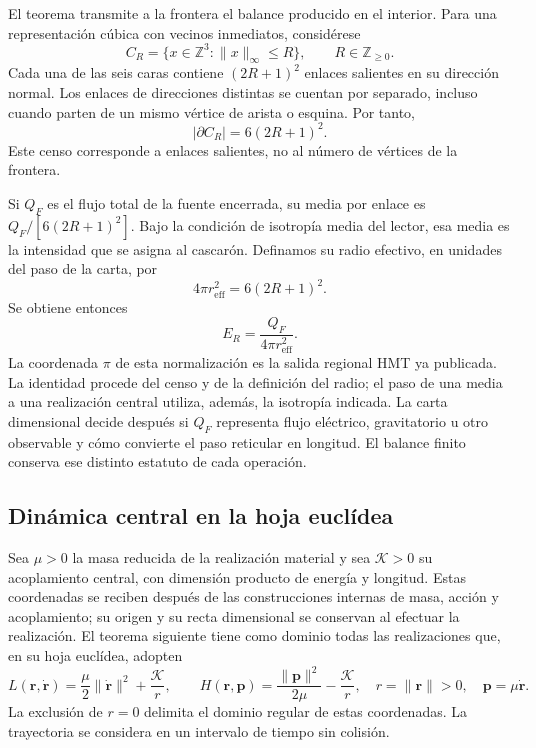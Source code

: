 El teorema transmite a la frontera el balance producido en el
interior. Para una representación cúbica con vecinos inmediatos,
considérese
\[
 C_R=\{x\in\mathbb Z^3:\|x\|_\infty\leq R\},
 \qquad R\in\mathbb Z_{\geq0}.
\]
Cada una de las seis caras contiene $(2R+1)^2$ enlaces
salientes en su dirección normal. Los enlaces de direcciones
distintas se cuentan por separado, incluso cuando parten de
un mismo vértice de arista o esquina. Por tanto,
\begin{equation}
 |\partial C_R|=6(2R+1)^2.
 \label{vi:eq:frontera-cubica}
\end{equation}
Este censo corresponde a enlaces salientes, no al número de
vértices de la frontera.

Si $Q_F$ es el flujo total de la fuente encerrada, su media
por enlace es $Q_F/[6(2R+1)^2]$. Bajo la condición de isotropía
media del lector, esa media es la intensidad que se asigna al
cascarón. Definamos su radio efectivo, en unidades del paso de
la carta, por
\begin{equation}
 4\pi r_{\mathrm{eff}}^2=6(2R+1)^2.
 \label{vi:eq:radio-efectivo}
\end{equation}
Se obtiene entonces
\begin{equation}
 E_R=\frac{Q_F}{4\pi r_{\mathrm{eff}}^2}.
 \label{vi:eq:inverso-area}
\end{equation}
La coordenada $\pi$ de esta normalización es la salida regional
HMT ya publicada. La identidad procede del censo y de la
definición del radio; el paso de una media a una realización
central utiliza, además, la isotropía indicada. La carta
dimensional decide después si $Q_F$ representa flujo eléctrico,
gravitatorio u otro observable y cómo convierte el paso
reticular en longitud. El balance finito conserva ese
distinto estatuto de cada operación.

\subsection{Dinámica central en la hoja euclídea}
\label{vi:subsec:dinamica-central}

Sea $\mu>0$ la masa reducida de la realización material y sea
$\mathcal K>0$ su acoplamiento central, con dimensión
producto de energía y longitud. Estas coordenadas se reciben después
de las construcciones internas de masa, acción y acoplamiento;
su origen y su recta dimensional se conservan al efectuar la
realización. El teorema siguiente tiene como dominio todas
las realizaciones que, en su hoja euclídea, adopten
\begin{equation}
 L(\mathbf r,\dot{\mathbf r})
 =\frac\mu2\|\dot{\mathbf r}\|^2+\frac{\mathcal K}{r},
 \qquad
 H(\mathbf r,\mathbf p)
 =\frac{\|\mathbf p\|^2}{2\mu}-\frac{\mathcal K}{r},
 \quad r=\|\mathbf r\|>0,
 \quad\mathbf p=\mu\dot{\mathbf r}.
 \label{vi:eq:kepler-lh}
\end{equation}
La exclusión de $r=0$ delimita el dominio regular de estas
coordenadas. La trayectoria se considera en un intervalo de
tiempo sin colisión.

